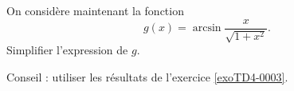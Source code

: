 
\begin{exercice}\label{exoTD4-0004}

	On considère maintenant la fonction
	\begin{equation}
		g(x)=\arcsin\frac{ x }{ \sqrt{1+x^2} }.
	\end{equation}
	Simplifier l'expression de $g$.

	Conseil : utiliser les résultats de l'exercice \ref{exoTD4-0003}.

\end{exercice}
